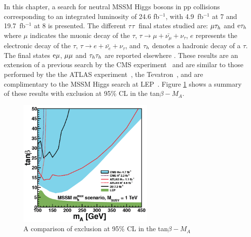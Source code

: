 In this chapter, a search for neutral MSSM Higgs bosons in pp collisions %
 corresponding to an integrated luminosity of 24.6 fb$^{-1}$, with 4.9~fb$^{-1}$ 
at 7 \TeV and 19.7~fb$^{-1}$ at 8 \TeV is presented. 
The different $\mathrm{\tau}\mathrm{\tau}$ final states studied are: $\mathrm{\mu}\mathrm{\tau}_{h}$ and $\mathrm{e}\mathrm{\tau}_{h}$
where $\mu$ indicates the muonic decay of the $\tau$,
$\tau\rightarrow\mu+\bar{\nu_{\mu}}+\nu_{\tau}$, $e$ represents the electronic
decay of the $\tau$, $\tau\rightarrow e+\bar{\nu_{e}}+\nu_{\tau}$, and $\mathrm{\tau}_{h}$ denotes a 
hadronic decay of a $\tau$. 
The final states
$\mathrm{e}\mathrm{\mu}$, $\mathrm{\mu}\mathrm{\mu}$ and $\mathrm{\tau}_{h}\mathrm{\tau}_{h}$
are reported elsewhere \cite{CMS-PAS-HIG-13-021}.
These results are an extension of a previous search by the CMS 
experiment~\cite{CMS-PAPER-HIG-10-002} and are similar to those performed by the the ATLAS 
experiment~\cite{Atlas-MSSM}, the Tevatron~\cite{Tevatron-MSSM, D0-MSSM, CDF-MSSM}, and are 
complimentary to the MSSM Higgs search at LEP~\cite{LEP2-MSSM}. 
Figure \ref{fig:MSSMSummary} shows a summary of these results with exclusion at 95\% CL in the tan$\beta-M_{A}$.

\begin{figure}[htbp]
  \begin{center}
    \includegraphics[width=0.6\textwidth]{images/MSSMSummary.png}
    \caption{
 A comparison of exclusion at 95\% CL in the tan$\beta-M_{A}$
    }
    \label{fig:MSSMSummary}
  \end{center}
\end{figure}

